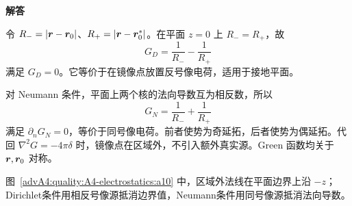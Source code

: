 \begin{advsolution}
\begin{center}\begin{minipage}{.96\linewidth}\centering
\raggedright{\bfseries\color{DeepBlue}解答}\par\smallskip\centering

\label{advA4:quality:A4-electrostatics:a10}
\end{minipage}\end{center}

令 $R_-=|\bm{r}-\bm{r}_0|$、$R_+=|\bm{r}-\bm{r}_0^*|$。在平面 $z=0$ 上 $R_-=R_+$，故
\[
 \boxed{G_D=\frac1{R_-}-\frac1{R_+}}
\]
满足 $G_D=0$。它等价于在镜像点放置反号像电荷，适用于接地平面。

对 Neumann 条件，平面上两个核的法向导数互为相反数，所以
\[
 \boxed{G_N=\frac1{R_-}+\frac1{R_+}}
\]
满足 $\partial_nG_N=0$，等价于同号像电荷。前者使势为奇延拓，后者使势为偶延拓。代回
$\nabla^2G=-4\pi\delta$ 时，镜像点在区域外，不引入额外真实源。Green 函数均关于 $\bm{r},\bm{r}_0$ 对称。

图~\ref{advA4:quality:A4-electrostatics:a10} 中，区域外法线在平面边界上沿 $-z$；Dirichlet条件用相反号像源抵消边界值，Neumann条件用同号像源抵消法向导数。
\end{advsolution}

